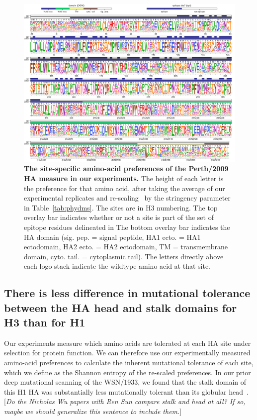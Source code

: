 \documentclass[9pt,twocolumn,twoside]{pnas-new}
\newcommand{\comment}[1]{{\color{red}[\textsl{#1}]}}
\begin{document}
\begin{figure}
\centering
\includegraphics[width=17cm]{figs/prefslogoplot/rescaled-avgprefs_prefs.pdf}
\caption{\label{fig:logoplot}
{\bf The site-specific amino-acid preferences of the Perth/2009 HA measure in our experiments.}
The height of each letter is the preference for that amino acid, after taking the average of our experimental replicates and re-scaling~\cite{hilton2017phydms} by the stringency parameter in Table~\ref{tab:phydms}.
The sites are in H3 numbering.
The top overlay bar indicates whether or not a site is part of the set of epitope residues delineated in \cite{wolf2006long}
The bottom overlay bar indicates the HA domain (sig. pep. = signal peptide, HA1 ecto. = HA1 ectodomain, HA2 ecto. = HA2 ectodomain, TM = transmembrane domain, cyto. tail. = cytoplasmic tail).
The letters directly above each logo stack indicate the wildtype amino acid at that site.
}
\end{figure}

\subsection*{There is less difference in mutational tolerance between the HA head and stalk domains for H3 than for H1}
Our experiments measure which amino acids are tolerated at each HA site under selection for protein function.
We can therefore use our experimentally measured amino-acid preferences to calculate the inherent mutational tolerance of each site, which we define as the Shannon entropy of the re-scaled preferences.
In our prior deep mutational scanning of the WSN/1933, we found that the stalk domain of this H1 HA was substantially less mutationally tolerant than its globular head~\cite{thyagarajan2014inherent,doud2016accurate}. \comment{Do the Nicholas Wu papers with Ren Sun compare stalk and head at all? If so, maybe we should generalize this sentence to include them.}
\end{document}
